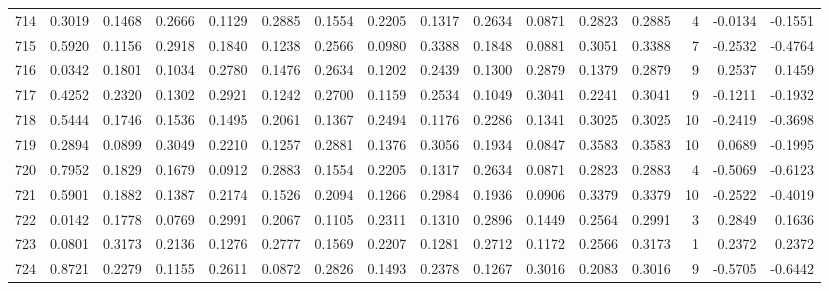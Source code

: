 \begin{tabular}{lrrrrrrrrrrrrrrr}
714 &      0.3019 &  0.1468 &  0.2666 &  0.1129 &  0.2885 &  0.1554 &  0.2205 &  0.1317 &  0.2634 &  0.0871 &   0.2823 &     0.2885 &      4 &                   -0.0134 &                    -0.1551 \\
715 &      0.5920 &  0.1156 &  0.2918 &  0.1840 &  0.1238 &  0.2566 &  0.0980 &  0.3388 &  0.1848 &  0.0881 &   0.3051 &     0.3388 &      7 &                   -0.2532 &                    -0.4764 \\
716 &      0.0342 &  0.1801 &  0.1034 &  0.2780 &  0.1476 &  0.2634 &  0.1202 &  0.2439 &  0.1300 &  0.2879 &   0.1379 &     0.2879 &      9 &                    0.2537 &                     0.1459 \\
717 &      0.4252 &  0.2320 &  0.1302 &  0.2921 &  0.1242 &  0.2700 &  0.1159 &  0.2534 &  0.1049 &  0.3041 &   0.2241 &     0.3041 &      9 &                   -0.1211 &                    -0.1932 \\
718 &      0.5444 &  0.1746 &  0.1536 &  0.1495 &  0.2061 &  0.1367 &  0.2494 &  0.1176 &  0.2286 &  0.1341 &   0.3025 &     0.3025 &     10 &                   -0.2419 &                    -0.3698 \\
719 &      0.2894 &  0.0899 &  0.3049 &  0.2210 &  0.1257 &  0.2881 &  0.1376 &  0.3056 &  0.1934 &  0.0847 &   0.3583 &     0.3583 &     10 &                    0.0689 &                    -0.1995 \\
720 &      0.7952 &  0.1829 &  0.1679 &  0.0912 &  0.2883 &  0.1554 &  0.2205 &  0.1317 &  0.2634 &  0.0871 &   0.2823 &     0.2883 &      4 &                   -0.5069 &                    -0.6123 \\
721 &      0.5901 &  0.1882 &  0.1387 &  0.2174 &  0.1526 &  0.2094 &  0.1266 &  0.2984 &  0.1936 &  0.0906 &   0.3379 &     0.3379 &     10 &                   -0.2522 &                    -0.4019 \\
722 &      0.0142 &  0.1778 &  0.0769 &  0.2991 &  0.2067 &  0.1105 &  0.2311 &  0.1310 &  0.2896 &  0.1449 &   0.2564 &     0.2991 &      3 &                    0.2849 &                     0.1636 \\
723 &      0.0801 &  0.3173 &  0.2136 &  0.1276 &  0.2777 &  0.1569 &  0.2207 &  0.1281 &  0.2712 &  0.1172 &   0.2566 &     0.3173 &      1 &                    0.2372 &                     0.2372 \\
724 &      0.8721 &  0.2279 &  0.1155 &  0.2611 &  0.0872 &  0.2826 &  0.1493 &  0.2378 &  0.1267 &  0.3016 &   0.2083 &     0.3016 &      9 &                   -0.5705 &                    -0.6442 \\

\end{tabular}
